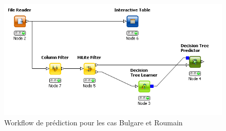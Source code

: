 \begin{figure}[H]
	\begin{center}
		\includegraphics[scale=0.5]{Image/workflowprediction}
		\caption{Workflow de prédiction pour les cas Bulgare et Roumain}
	\end{center}
\end{figure}